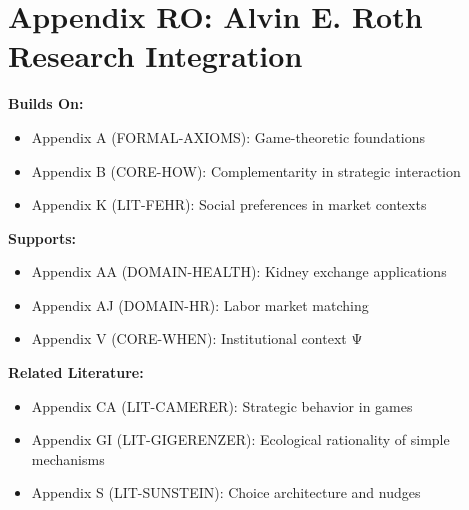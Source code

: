 
\chapter*{Appendix RO: Alvin E. Roth Research Integration}
\label{app:roth}

\begin{tcolorbox}[colback=blue!5!white,colframe=blue!75!black,title=Cross-Reference Map]
\textbf{Builds On:}
\begin{itemize}
    \item Appendix A (FORMAL-AXIOMS): Game-theoretic foundations
    \item Appendix B (CORE-HOW): Complementarity in strategic interaction
    \item Appendix K (LIT-FEHR): Social preferences in market contexts
\end{itemize}

\textbf{Supports:}
\begin{itemize}
    \item Appendix AA (DOMAIN-HEALTH): Kidney exchange applications
    \item Appendix AJ (DOMAIN-HR): Labor market matching
    \item Appendix V (CORE-WHEN): Institutional context Ψ
\end{itemize}

\textbf{Related Literature:}
\begin{itemize}
    \item Appendix CA (LIT-CAMERER): Strategic behavior in games
    \item Appendix GI (LIT-GIGERENZER): Ecological rationality of simple mechanisms
    \item Appendix S (LIT-SUNSTEIN): Choice architecture and nudges
\end{itemize}
\end{tcolorbox}

